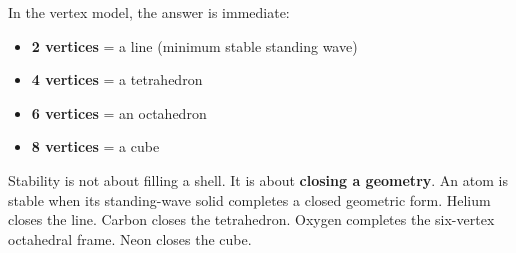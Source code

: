 \documentclass[11pt, letterpaper, openany]{book}
\begin{document}
In the vertex model, the answer is immediate:

\begin{itemize}
    \item \textbf{2 vertices} = a line (minimum stable standing wave)
    \item \textbf{4 vertices} = a tetrahedron
    \item \textbf{6 vertices} = an octahedron
    \item \textbf{8 vertices} = a cube
\end{itemize}

Stability is not about filling a shell. It is about \textbf{closing a
geometry}. An atom is stable when its standing-wave solid completes a
closed geometric form. Helium closes the line. Carbon closes the
tetrahedron. Oxygen completes the six-vertex octahedral frame. Neon
closes the cube.
\end{document}
